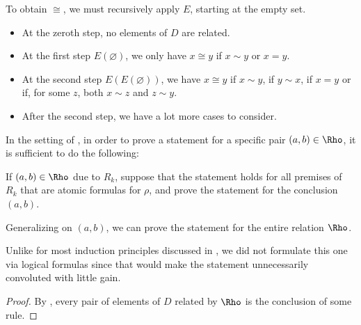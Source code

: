 \begin{example}
  To obtain \( {\cong} \), we must recursively apply \( E \), starting at the empty set.
  \begin{itemize}
    \item At the zeroth step, no elements of \( D \) are related.
    \item At the first step \( E(\varnothing) \), we only have \( x \cong y \) if \( x \sim y \) or \( x = y \).
    \item At the second step \( E(E(\varnothing)) \), we have \( x \cong y \) if \( x \sim y \), if \( y \sim x \), if \( x = y \) or if, for some \( z \), both \( x \sim z \) and \( z \sim y \).
    \item After the second step, we have a lot more cases to consider.
  \end{itemize}
\end{example}

\begin{theorem}\label{thm:induction_on_recursively_defined_relations}
  In the setting of , in order to prove a statement for a specific pair \( (a, b) \in \Rho \), it is sufficient to do the following:
  \begin{displayquote}
    If \( (a, b) \in \Rho \) due to \( R_k \), suppose that the statement holds for all premises of \( R_k \) that are atomic formulas for \( \rho \), and prove the statement for the conclusion \( (a, b) \).
  \end{displayquote}

  Generalizing on \( (a, b) \), we can prove the statement for the entire relation \( \Rho \).
\end{theorem}
\begin{comments}
  \item Unlike for most induction principles discussed in , we did not formulate this one via logical formulas since that would make the statement unnecessarily convoluted with little gain.
\end{comments}
\begin{proof}
  By , every pair of elements of \( D \) related by \( \Rho \) is the conclusion of some rule.
\end{proof}

